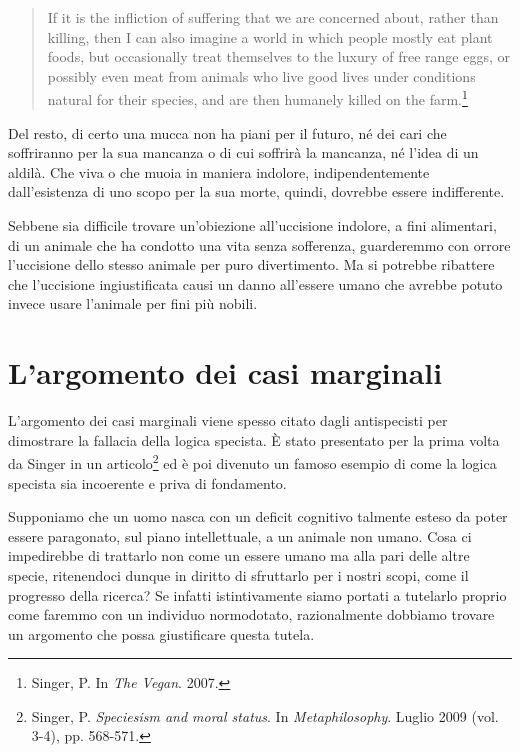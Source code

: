 \begin{quote}

    If it is the infliction of suffering that we are concerned about, rather than killing, then I
    can also imagine a world in which people mostly eat plant foods, but occasionally treat
    themselves to the luxury of free range eggs, or possibly even meat from animals who live good
    lives under conditions natural for their species, and are then humanely killed on the
    farm.\footnote{Singer, P. In \emph{The Vegan}. 2007.}

\end{quote}

Del resto, di certo una mucca non ha piani per il futuro, né dei cari che soffriranno per la sua
mancanza o di cui soffrirà la mancanza, né l'idea di un aldilà. Che viva o che muoia in maniera
indolore, indipendentemente dall'esistenza di uno scopo per la sua morte, quindi, dovrebbe essere
indifferente.

Sebbene sia difficile trovare un'obiezione all'uccisione indolore, a fini alimentari, di un animale
che ha condotto una vita senza sofferenza, guarderemmo con orrore l'uccisione dello stesso animale
per puro divertimento. Ma si potrebbe ribattere che l'uccisione ingiustificata causi un danno
all'essere umano che avrebbe potuto invece usare l'animale per fini più nobili.

\section{L'argomento dei casi marginali}

L'argomento dei casi marginali viene spesso citato dagli antispecisti per dimostrare la fallacia
della logica specista. È stato presentato per la prima volta da Singer in un
articolo\footnote{Singer, P. \emph{Speciesism and moral status}. In \emph{Metaphilosophy}. Luglio
2009 (vol. 3-4), pp. 568-571.} ed è poi divenuto un famoso esempio di come la logica specista sia
incoerente e priva di fondamento.

Supponiamo che un uomo nasca con un deficit cognitivo talmente esteso da poter essere paragonato,
sul piano intellettuale, a un animale non umano. Cosa ci impedirebbe di trattarlo non come un essere
umano ma alla pari delle altre specie, ritenendoci dunque in diritto di sfruttarlo per i nostri
scopi, come il progresso della ricerca? Se infatti istintivamente siamo portati a tutelarlo proprio
come faremmo con un individuo normodotato, razionalmente dobbiamo trovare un argomento che possa
giustificare questa tutela.

